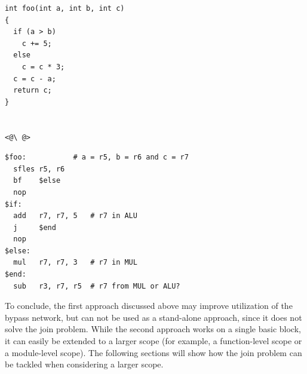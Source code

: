\label{lst:join_problem}
\begin{center}
\hspace{2px}\begin{minipage}{.475\textwidth}
\lstset{style=customc}
\begin{lstlisting}[frame=tlrb]
int foo(int a, int b, int c)
{
  if (a > b)
    c += 5;
  else
    c = c * 3;
  c = c - a;
  return c;
}


<@\ @>
\end{lstlisting}
\end{minipage}\hfill
\begin{minipage}{.475\textwidth}
\lstset{style=customasm}
\begin{lstlisting}[frame=tlrb]
$foo:           # a = r5, b = r6 and c = r7
  sfles r5, r6
  bf    $else
  nop
$if:
  add   r7, r7, 5   # r7 in ALU
  j     $end
  nop
$else:
  mul   r7, r7, 3   # r7 in MUL 
$end:
  sub   r3, r7, r5  # r7 from MUL or ALU?
\end{lstlisting}
\end{minipage}
\end{center}

To conclude, the first approach discussed above may improve utilization of the bypass network, but can not be used as a stand-alone approach, since it does not solve the join problem. While the second approach works on a single basic block, it can easily be extended to a larger scope (for example, a function-level scope or a module-level scope). The following sections will show how the join problem can be    tackled when considering a larger scope. 



